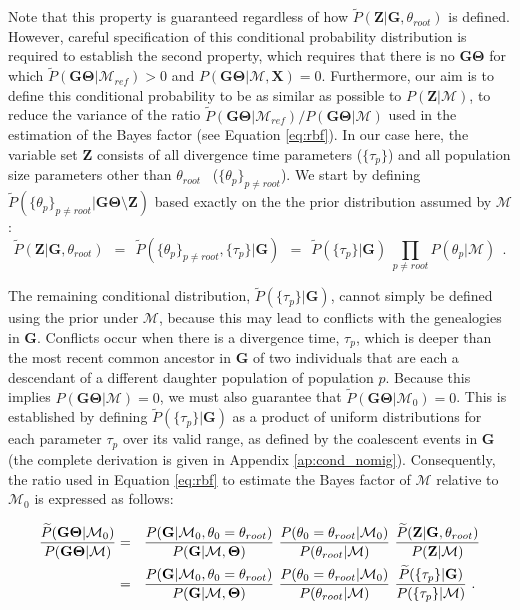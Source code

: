 \documentclass[11pt]{article}
\newcommand{\vect}[1]{\boldsymbol{\mathbf{#1}}}
\newcommand{\X}{\vect{X}}
\newcommand{\M}{\mathcal{M}}
\newcommand{\G}{\vect{G}}
\newcommand{\T}{\vect{\Theta}}
\newcommand{\GT}{\G\T}
\newcommand{\Mref}{\M_{ref}}
\newcommand{\Pref}{\widetilde{P}}
\newcommand{\Z}{\vect{Z}}
\newcommand{\troot}{\theta_{root}}
\begin{document}
%
Note that this property is guaranteed regardless of how $\Pref(\Z|\G,\troot)$ is defined.
However, careful specification of this conditional probability distribution is required 
to establish the second property, which requires that there is no $\GT$ for which $\Pref(\GT|\Mref)>0$ and $P(\GT|\M,\X)=0$.
%
Furthermore, our aim is to define this conditional probability to be as similar as possible to $P(\Z|\M)$,
to reduce the variance of the ratio
$\Pref(\GT|\Mref) / P(\GT|\M)$ used in the estimation of the Bayes factor (see Equation \ref{eq:rbf}).
%
In our case here, the variable set $\Z$ consists of all divergence time parameters ($\{\tau_p\}$)
and all population size parameters other than $\troot$ ~($\{\theta_p\}_{p\neq root}$).
%
We start by defining $\Pref(\{\theta_p\}_{p\neq root}|\GT\setminus\Z)$ based exactly on the the prior distribution
assumed by $\M$:
%
%
\begin{equation}
 \Pref(\Z|\G,\troot) ~~=~~ \Pref(\{\theta_p\}_{p\neq root},\{\tau_p\}|\G) ~~=~~ 
 \Pref(\{\tau_p\}|\G) \ \prod_{p\neq root} P(\theta_p|\M)\  ~.\label{eq:cond_tau}
\end{equation}


The remaining conditional distribution, $\Pref(\{\tau_p\}|\G)$, cannot simply be defined using the
prior under $\M$, because this may lead to conflicts with the genealogies in $\G$.
%
Conflicts occur when there is a divergence time, $\tau_p$, which is deeper than the most recent common ancestor
in $\G$ of two individuals that are each a descendant of a different daughter population of population $p$.
%
Because this implies $P(\GT|\M) = 0$, we must also guarantee that $\Pref(\GT|\M_0)=0$.
%
This is established by defining $\Pref(\{\tau_p\}|\G)$ as a product of uniform distributions for each parameter $\tau_p$
over its valid range, as defined by the coalescent events in $\G$
%
(the complete derivation is given in Appendix \ref{ap:cond_nomig}).
%
Consequently, the ratio used in Equation \ref{eq:rbf} to estimate the Bayes factor of $\M$ relative to $\M_0$ is expressed as follows:
%
%
\begin{small}
\begin{align}
\frac{\Pref(\GT|\M_0) }{P(\GT|\M)}
&=~~ \frac{ P(\G|\M_0,\theta_0=\troot) }{ P(\G|\M,\T)}~ 
     \frac{ P(\theta_0=\troot|\M_0)}{P(\troot|\M)}~
     \frac{ \Pref(\Z|\G,\troot)}{P(\Z|\M)} \notag \\
&=~~ \frac{ P(\G|\M_0,\theta_0=\troot) }{ P(\G|\M,\T)}~ 
     \frac{ P(\theta_0=\troot|\M_0)}{P(\troot|\M)}\
     \frac{ \Pref(\{\tau_p\}|\G)}{P(\{\tau_p\}|\M)} ~. \label{eq:rbf_null}
\end{align}
\end{small}
\end{document}
